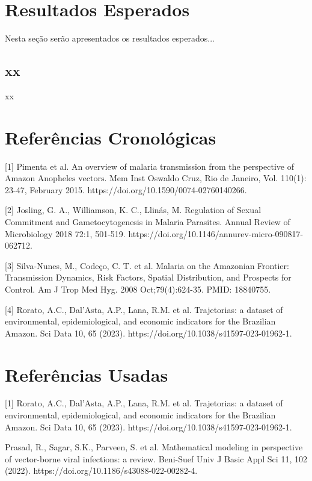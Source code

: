 \documentclass[12pt]{article}
\begin{document}
\newpage
\section{Resultados Esperados}

Nesta seção serão apresentados os resultados esperados...

\subsection{xx}

xx

\newpage

\section{Referências Cronológicas}

[1] Pimenta et al. An overview of malaria transmission from the perspective of Amazon $\text{Anopheles vectors}$. Mem Inst Oswaldo Cruz, Rio de Janeiro, Vol. 110(1): 23-47, February 2015. https://doi.org/10.1590/0074-02760140266.  

[2] Josling, G. A., Williamson, K. C., Llinás, M. Regulation of Sexual Commitment and Gametocytogenesis in Malaria Parasites. Annual Review of Microbiology 2018 72:1, 501-519. https://doi.org/10.1146/annurev-micro-090817-062712. 

[3] Silva-Nunes, M., Codeço, C. T. et al. Malaria on the Amazonian Frontier: Transmission Dynamics, Risk Factors, Spatial Distribution, and Prospects for Control. Am J Trop Med Hyg. 2008 Oct;79(4):624-35. PMID: 18840755.

[4] Rorato, A.C., Dal’Asta, A.P., Lana, R.M. et al. Trajetorias: a dataset of environmental, epidemiological, and economic indicators for the Brazilian Amazon. Sci Data 10, 65 (2023). https://doi.org/10.1038/s41597-023-01962-1.

\newpage
\section{Referências Usadas}

[1] Rorato, A.C., Dal’Asta, A.P., Lana, R.M. et al. Trajetorias: a dataset of environmental, epidemiological, and economic indicators for the Brazilian Amazon. Sci Data 10, 65 (2023). https://doi.org/10.1038/s41597-023-01962-1.

\noindent [2] Prasad, R., Sagar, S.K., Parveen, S. et al. Mathematical modeling in perspective of vector-borne viral infections: a review. Beni-Suef Univ J Basic Appl Sci 11, 102 (2022). https://doi.org/10.1186/s43088-022-00282-4.
\end{document}
